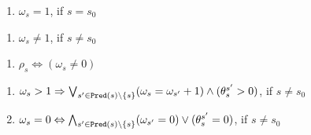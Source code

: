 \documentclass{llncs}
\newcommand{\ttransition}[1]{\ensuremath{\theta_{#1}}}
\newcommand{\transition}[2]{\ensuremath{\ttransition{#1}^{#2}}}
\newcommand{\Pred}{\ensuremath{{\tt{Pred}}}}
\newcommand{\enumerateConstraints}{
	\renewcommand{\labelenumi}{\theenumi}
	\renewcommand{\theenumi}{(\textbf{\arabic{enumi})}}}
\begin{document}
\begin{minipage}{\textwidth}
  \hspace*{.2cm}
  \begin{minipage}[t]{.3\textwidth}
    \begin{enumerate}
      \enumerateConstraints
      \setcounter{enumi}{5}
      \item {$\omega_{s} = 1$, if $s = s_0$}\label{encoding_er_init_state}%
    \end{enumerate}
  \end{minipage}
  \hspace{.02\textwidth}
  \begin{minipage}[t]{.3\textwidth}
    \begin{enumerate}
      \enumerateConstraints
      \setcounter{enumi}{6}
      \item { $\omega_s \neq 1$, if $s \neq s_0$}\label{encoding_er_non_init_state}%
    \end{enumerate}
  \end{minipage}
  \hspace{.02\textwidth}
  \begin{minipage}[t]{.28\textwidth}
    \begin{enumerate}
      \enumerateConstraints
      \setcounter{enumi}{7}
      \item { $\rho_s \Leftrightarrow (\omega_s \neq 0)$}\label{encoding_er_bool_var}%
    \end{enumerate}
  \end{minipage}  
  \hspace*{0.25cm}
  \begin{minipage}[t]{.93\textwidth}
  	\vspace*{-0.25cm}
    \begin{enumerate}
      \enumerateConstraints
      \setcounter{enumi}{8}
      \item { $\omega_s > 1 \Rightarrow \bigvee_{s^\prime \in \Pred(s) \setminus \{ s \} }(\omega_s = \omega_{s^\prime} + 1) \wedge (\transition{s}{s^\prime} > 0)$,
		 if $s \neq s_0$}\label{encoding_er_propag_reach}%
      \item { $\omega_s = 0 \Leftrightarrow \bigwedge_{s^\prime \in \Pred(s) \setminus \{ s \} }(\omega_{s^\prime} = 0) \vee (\transition{s}{s^\prime} = 0)$,
		 if $s \neq s_0$}\label{encoding_er_propag_non_reach}%
    \end{enumerate}
  \end{minipage}  
\end{minipage}
\end{document}
